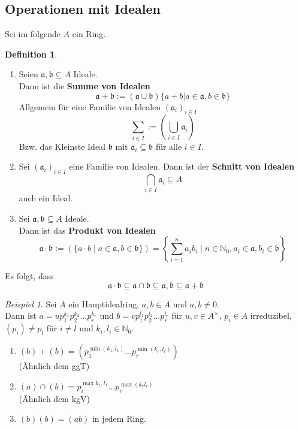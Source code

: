 \documentclass[10pt,a4paper]{article}
\newcommand{\N}{\ensuremath{\mathbb{N}}}
\newcounter{thm}[section]
\theoremstyle{definition}
\newtheorem{definition}[thm]{Definition}
\theoremstyle{plain}
\theoremstyle{remark}
\newtheorem{exm}[thm]{Beispiel}
\begin{document}
\subsection{Operationen mit Idealen}
Sei im folgende $A$ ein Ring.

\begin{definition}
	\begin{enumerate}
		\item Seien $\mathfrak a,\mathfrak b\subseteq A$ Ideale.\\
		Dann ist die \textbf{Summe von Idealen}
		\[\mathfrak{a+b}:=(\mathfrak{a\cup b})\{a+b|a\in\mathfrak a,b\in\mathfrak b\}\]
		Allgemein für  eine Familie von Idealen $(\mathfrak a_i)_{i\in I}$
		\[\sum_{i\in I}:=\left(\bigcup_{i\in I}\mathfrak a_i\right)\]
		Bzw. das Kleinste Ideal $\mathfrak b$ mit $\mathfrak a_i\subseteq \mathfrak b$ für alle $i\in I$.
		\item Sei $(\mathfrak a_i)_{i\in I}$ eine Familie von Idealen. Dann ist der \textbf{Schnitt von Idealen}
		\[\bigcap_{i\in I}\mathfrak a_i\subseteq A\]
		auch ein Ideal.
		\item Sei $\mathfrak{a,b}\subseteq A$ Ideale.\\
		Dann ist das \textbf{Produkt von Idealen}
		\[\mathfrak{a\cdot b}:=(\{a\cdot b\mid a\in\mathfrak a,b\in\mathfrak b\})=\left\{\sum_{i=1}^{n}a_ib_i\mid n\in\N_0,a_i\in\mathfrak a,b_i\in\mathfrak b\right\}\] 
	\end{enumerate}
	Es folgt, dass \[\mathfrak a\cdot\mathfrak b\subseteq \mathfrak a\cap\mathfrak b\subseteq \mathfrak a,\mathfrak b\subseteq\mathfrak a+\mathfrak b\]
\end{definition}

\begin{exm}
	Sei $A$ ein Hauptidealring, $a,b\in A$ und $a,b\neq 0$.\\
	Dann ist $a=up_1^{k_1}p_2^{k_2}...p_{r}^{k_r}$ und $b=vp_1^{l_1}p_2^{l_2}...p_{r}^{l_r}$ für $u,v\in A^\times$, $p_i\in A$ irreduzibel, $(p_i)\neq p_l$ für $i\neq l$ und $k_i,l_i\in\N_0$.
	\begin{enumerate}
		\item $(b)+(b)=\left(p_1^{\min(k_1,l_1)}...p_{r}^{\min(k_r,l_r)}\right)$\\
		(Ähnlich dem ggT)
		\item $(a)\cap(b)=p_i^{\max k_1,l_1}...p_r^{\max(k_rl_r)}$\\
		(Ähnlich dem kgV)
		\item $(b)(b)=(ab)$ in jedem Ring.
	\end{enumerate}
\end{exm}
\end{document}
